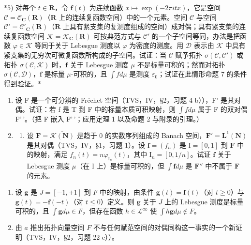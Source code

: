 *5) 对每个 \(t \in \mathbf{R}\)，令 \(\mathbf{f}(t)\) 为连续函数 \(x \mapsto \exp(-2\pi itx)\)，它是空间 \(\mathcal{C} = \mathcal{C}_{\mathbf{C}}(\mathbf{R})\)（\(\mathbf{R}\) 上的连续复函数空间）中的一个元素。空间 \(\mathcal{C}\) 与空间 \(\mathcal{C}' = \mathcal{C}'_{\mathbf{C}}(\mathbf{R})\)（\(\mathbf{R}\) 上具有紧支集的复测度组成的空间）成对偶；具有紧支集的连续复函数空间 \(\mathcal{K} = \mathcal{K}_{\mathbf{C}}(\mathbf{R})\) 可按典范方式与 \(\mathcal{C}'\) 的一个子空间等同，办法是把函数 \(\varphi \in \mathcal{K}\) 等同于关于 Lebesgue 测度以 \(\varphi\) 为密度的测度。用 \(\mathcal{D}\) 表示由 \(\mathcal{K}\) 中具有紧支集的无穷次可微复函数所构成的子空间。试证：当 \(\mathcal{C}\) 赋予拓扑 \(\sigma(\mathcal{C},\mathcal{C}')\) 或拓扑 \(\sigma(\mathcal{C},\mathcal{K})\) 时，\(\mathbf{f}\) 关于 Lebesgue 测度 \(\mu\) 不是标量可积的；然而对拓扑 \(\sigma(\mathcal{C},\mathcal{D})\)，\(\mathbf{f}\) 是标量 \(\mu\)-可积的，且 \(\int f d\mu\) 是测度 \(\varepsilon_0\)；试证在此情形命题 7 的条件得到验证。*

\begin{enumerate}
\def\labelenumi{\arabic{enumi})}
\setcounter{enumi}{5}
\item
  设 F 是一个可分辨的 Fréchet 空间（TVS，IV，§2，习题 4 b）），F' 是其对偶。试证：若 f 是 T 到 F 中的标量本质可积映射，则 \(\int f d\mu\) 属于 F 的双对偶 F'\,'。（把 F 嵌入 F'\,'；应用定理 1 以及命题 2 与附录的引理。）
\item
  \begin{enumerate}
  \def\labelenumii{\alph{enumii})}
  \tightlist
  \item
    设 \(\mathbf{F} = \overline{\mathcal{K}(\mathbf{N})}\) 是趋于 0 的实数序列组成的 Banach 空间，\(\mathbf{F}' = \mathbf{L}^1 (\mathbf{N})\) 是其对偶（TVS，IV，§1，习题 1）。设 \(\mathbf{f} = (f_n)\) 是 \(\mathrm{I} = [0,1]\) 到 \(\mathbf{F}\) 中的映射，满足 \(f_{n}(t) = n\varphi_{\mathrm{I}_{n}}(t)\)，其中 \(\mathrm{I}_n = [0,1 / n]\)。试证 \(\mathbf{f}\) 关于 Lebesgue 测度 \(\mu\)（在 \(\mathrm{I}\) 上）是标量可积的，但 \(\int \mathbf{f}d\mu\) 是 \(\mathbf{F}''\) 中不属于 \(\mathbf{F}\) 的元素。
  \end{enumerate}
\end{enumerate}

\begin{enumerate}
\def\labelenumi{\alph{enumi})}
\setcounter{enumi}{1}
\item
  设 \(\mathbf{g}\) 是 \(J = [-1, +1]\) 到 \(F\) 中的映射，由条件 \(\mathbf{g}(t) = \mathbf{f}(t)\)（对 \(t \geqslant 0\)）与 \(\mathbf{g}(t) = -\mathbf{f}(-t)\)（对 \(t \leqslant 0\)）定义。则 \(\mathbf{g}\) 关于 \(J\) 上的 Lebesgue 测度是标量可积的，且 \(\int \mathbf{g} d\mu \in F\)，但存在函数 \(h \in \mathcal{L}^{\infty}\) 使 \(\int h\mathbf{g} d\mu \notin F\)。
\item
  由 \(a\) 推出拓扑向量空间 \(F\) 不与任何赋范空间的对偶同构这一事实的一个新证明（TVS，IV，§2，习题 22 c））。
\end{enumerate}

